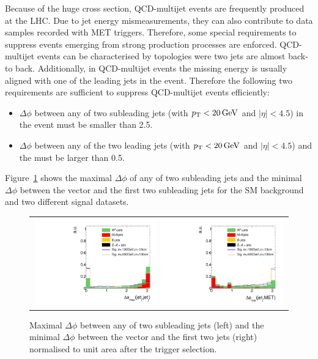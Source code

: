 Because of the huge cross section, QCD-multijet events are frequently produced at the LHC.
Due to jet energy mismeasurements, they can also contribute to data samples recorded with MET triggers.
Therefore, some special requirements to suppress events emerging from strong production processes are enforced.
QCD-multijet events can be characterised by topologies were two jets are almost back-to back.
Additionally, in QCD-multijet events the missing energy is usually aligned with one of the leading jets in the event.
Therefore the following two requirements are sufficient to suppress QCD-multijet events efficiently:
\begin{itemize}
\renewcommand{\labelitemi}{\footnotesize{\ding{118}}}
\item $\Delta\phi$ between any of two subleading jets (with $p_{\text{T}}<20\,\text{Ge}\kern-0.06667em\text{V}$ and $|\eta|<4.5$) in the event must be smaller than 2.5. %
\item $\Delta\phi$ between any of the two leading jets (with $p_{\text{T}}<20\,\text{Ge}\kern-0.06667em\text{V}$ and $|\eta|<4.5$) and the \met must be larger than 0.5. %
\end{itemize}
Figure~\ref{fig:QCDcuts} shows the maximal $\Delta\phi$ of any of two subleading jets and the minimal $\Delta\phi$ between the \met vector and the first two subleading jets for the SM background and two different signal datasets.
\begin{figure}[!t]
  \centering 
  \begin{tabular}{c}
    \includegraphics[width=0.49\textwidth]{figures/analysis/AnalysisSelection/chiTrackstriggerRequirementsTrigger_2Signals_FullBkg/hDeltaPhiMaxbeforeCut_lin.pdf}
    \includegraphics[width=0.49\textwidth]{figures/analysis/AnalysisSelection/chiTrackstriggerRequirementsTrigger_2Signals_FullBkg/hDeltaPhiJetMetMinbeforeCut_lin.pdf}
  \end{tabular}
  \caption{Maximal $\Delta \phi$ between any of two subleading jets (left) and the minimal $\Delta \phi$  between the \met vector and the first two jets (right) normalised to unit area after the trigger selection.}
  \label{fig:QCDcuts}
\end{figure}
\hspace{0.9cm}

